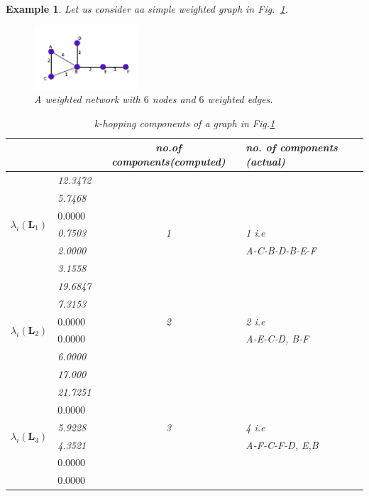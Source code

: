 \documentclass[10pt,a4paper]{article}
\newtheorem{exa}{Example}
\begin{document}
    	    \begin{exa}
    	    	Let us consider aa simple weighted graph in Fig.~\ref{weighted}.
    	    	\begin{figure}[!h]
    	    		\centering
    	    		\vspace{0pt}
    	    		\includegraphics[width= 0.35\textwidth]{images/centralities-weighted.pdf}
    	    		\caption{ A weighted network with $6$ nodes and $6$ weighted edges.} \label{weighted}
    	    	\end{figure} 
    	    	
    	    	\begin{table}[!h]
    	    		\centering
    	    		\begin{tabular}{ |l|l|c|l| }
    	    			\hline
    	    			& & no.of components(computed) & no. of components (actual)\\
    	    			\hline
    	    			\multirow{6}{*}{$\lambda_i(\mathbf{L}_1)$} 
    	    			& 12.3472& & \\
    	    			& 5.7468 & & \\
    	    			& $\mathbf{0.0000}$ & & \\
    	    			& 0.7503 & 1&1 i.e  \\
    	    			& 2.0000 & & A-C-B-D-B-E-F\\
    	    			& 3.1558 & & \\
    	    			\hline
    	    			\multirow{6}{*}{$\lambda_i(\mathbf{L}_2)$} 
    	    			& 19.6847& &\\
    	    			& 7.3153 & & \\
    	    			& $\mathbf{0.0000}$ &2 & 2 i.e\\
    	    			& $\mathbf{0.0000}$ & &A-E-C-D, B-F \\
    	    			& 6.0000 & & \\
    	    			& 17.000 & & \\
    	    			\hline
    	    			\multirow{6}{*}{$\lambda_i(\mathbf{L}_3)$} 
    	    			& 21.7251& &\\
    	    			& $\mathbf{0.0000}$ & & \\
    	    			& 5.9228 &3 & 4 i.e\\
    	    			& 4.3521 & &A-F-C-F-D, E,B \\
    	    			& $\mathbf{0.0000}$ & & \\
    	    			& $\mathbf{0.0000}$ & & \\
    	    			\hline
    	    		\end{tabular}   
    	    		\caption{k-hopping components of a graph in Fig.\ref{weighted}} 
    	    		\label{tablecomponentsg1}
    	    	\end{table}
    	    	

\end{exa}
\end{document}
